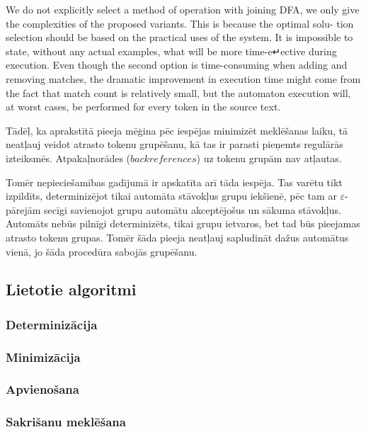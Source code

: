 We do not explicitly select a method of operation with joining DFA, we only give the complexities of the proposed variants. This is because the optimal solu-
tion selection should be based on the practical uses of the system. It is impossible to state, without any actual examples, what will be more time-e↵ective during execution. Even though the second option is time-consuming when adding and removing matches, the dramatic improvement in execution time might come from the fact that match count is relatively small, but the automaton execution will, at worst cases, be performed for every token in the source text.



Tādēļ, ka aprakstītā pieeja mēģina pēc iespējas minimizēt meklēšanas laiku, tā neatļauj veidot atrasto tokenu grupēšanu, kā tas ir parasti pieņemts regulārās izteiksmēs. Atpakaļnorādes ($backreferences$) uz tokenu grupām nav atļautas.

Tomēr nepieciešamības gadījumā ir apskatīta arī tāda iespēja. Tas varētu tikt izpildīts, determinizējot tikai automāta stāvokļus grupu iekšienē, pēc tam ar $\varepsilon$-pārejām secīgi savienojot grupu automātu akceptējošus un sākuma stāvokļus. Automāts nebūs pilnīgi determinizēts, tikai grupu ietvaros, bet tad būs pieejamas atrasto tokenu grupas. Tomēr šāda pieeja neatļauj sapludināt dažus automātus vienā, jo šāda procedūra sabojās grupēšanu.

\subsection{Lietotie algoritmi}
\label{subsec:solution_algorithms}

\subsubsection{Determinizācija}

\subsubsection{\label{subsubsec:prototype_minimization}Minimizācija}

\subsubsection{Apvienošana}

\subsubsection{Sakrišanu meklēšana}

